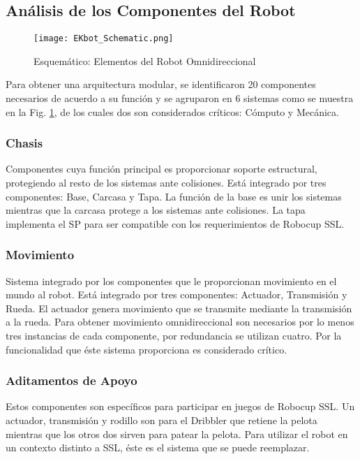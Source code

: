 \subsection{Análisis de los Componentes del Robot}

\begin{figure}
	\centering
		\texttt{[image: EKbot\_Schematic.png]}
	\caption{Esquemático: Elementos del Robot Omnidireccional}
	\label{fig:ekbot_schematic}
\end{figure}
Para obtener una arquitectura modular, se identificaron 20 componentes necesarios de acuerdo a su función y se agruparon en 6 sistemas como se muestra en la Fig. \ref{fig:ekbot_schematic}, de los cuales dos son considerados críticos: Cómputo y Mecánica. 

\subsubsection{Chasis}
Componentes cuya función principal es proporcionar soporte estructural, protegiendo al resto de los sistemas ante colisiones. Está integrado por tres componentes: Base, Carcasa y Tapa. La función de la base es unir los sistemas mientras que la carcasa protege a los sistemas ante colisiones. La tapa implementa el \gls{SP} para ser compatible con los requerimientos de Robocup \gls{SSL}.

\subsubsection{Movimiento}
Sistema integrado por los componentes que le proporcionan movimiento en el mundo al robot. Está integrado por tres componentes: Actuador, Transmisión y Rueda. El actuador genera movimiento que se transmite mediante la transmisión a la rueda. Para obtener movimiento omnidireccional son necesarios por lo menos tres instancias de cada componente, por redundancia se utilizan cuatro. Por la funcionalidad que éste sistema proporciona es considerado crítico.

\subsubsection{Aditamentos de Apoyo}
Estos componentes son específicos para participar en juegos de Robocup \gls{SSL}. Un actuador, transmisión y rodillo son para el \gls{Dribbler} que retiene la pelota mientras que los otros dos sirven para patear la pelota. Para utilizar el robot en un contexto distinto a \gls{SSL}, éste es el sistema que se puede reemplazar.

